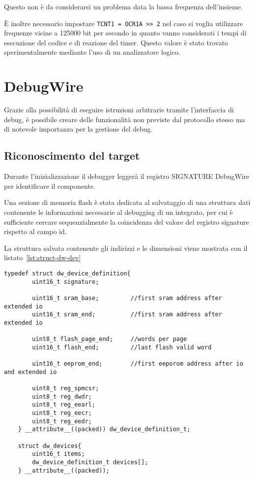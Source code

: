 Questo non è da considerarsi un problema data la bassa frequenza dell'insieme.

È inoltre necessario impostare \texttt{TCNT1 = OCR1A >\textcompwordmark> 2} nel caso si voglia utilizzare frequenze vicine a 125000 bit per secondo in quanto vanno considerati i tempi di esecuzione del codice e di reazione del timer. Questo valore è stato trovato sperimentalmente mediante l'uso di un analizzatore logico.

\section{DebugWire}

Grazie alla possibilità di eseguire istruzioni arbitrarie tramite l'interfaccia di debug, è possibile creare delle funzionalità non previste dal protocollo stesso ma di notevole importanza per la gestione del debug.

\subsection{Riconoscimento del target}

Durante l'inizializzazione il debugger leggerà il registro SIGNATURE DebugWire per identificare il componente.

Una sezione di memoria flash è stata dedicata al salvataggio di una struttura dati contenente le informazioni necessarie al debugging di un integrato, per cui è sufficiente cercare sequenzialmente la coincidenza del valore del registro signature rispetto al campo id.

La struttura salvata contenente gli indirizzi e le dimensioni viene mostrata con il listato~\ref{lst:struct-dw-dev}

\noindent\begin{minipage}{\textwidth}
    \begin{lstlisting}[style=C, caption={Strutture utilizzate nel codice finale per il salvataggio e la ricerca dei parametri associati al target connesso}, label=lst:struct-dw-dev]
    typedef struct dw_device_definition{
        uint16_t signature;

        uint16_t sram_base;         //first sram address after extended io
        uint16_t sram_end;          //first sram address after extended io

        uint8_t flash_page_end;     //words per page
        uint16_t flash_end;         //last flash valid word

        uint16_t eeprom_end;        //first eeporom address after io and extended io

        uint8_t reg_spmcsr;
        uint8_t reg_dwdr;
        uint8_t reg_eearl;
        uint8_t reg_eecr;
        uint8_t reg_eedr;
    } __attribute__((packed)) dw_device_definition_t;

    struct dw_devices{
        uint16_t items;
        dw_device_definition_t devices[];
    } __attribute__((packed));
    \end{lstlisting}
\end{minipage}

